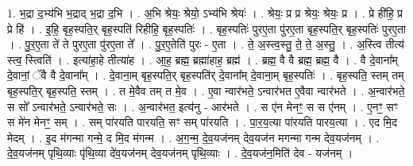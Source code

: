 \documentclass[17pt]{extarticle}
\begin{document}
1. भ॒द्रा द॒भ्य॑भि भ॒द्राद् भ॒द्रा द॒भि । . अ॒भि श्रेयः॒ श्रेयो॒ ऽभ्य॑भि श्रेयः॑ । . श्रेयः॒ प्र प्र श्रेयः॒ श्रेयः॒ प्र । . प्रे ही॑हि॒ प्र प्रे हि॑ । . इ॒हि॒ बृह॒स्पति॒र् बृह॒स्पति॑ रिहीहि॒ बृह॒स्पतिः॑ । . बृह॒स्पतिः॑ पुरए॒ता पु॑रए॒ता बृह॒स्पति॒र् बृह॒स्पतिः॑ पुरए॒ता । . पु॒र॒ए॒ता ते॑ ते पुरए॒ता पु॑रए॒ता ते᳚ । . पु॒र॒ए॒तेति॑ पुरः - ए॒ता । . ते॒ अ॒स्त्व॒स्तु॒ ते॒ ते॒ अ॒स्तु॒ । . अ॒स्त्वि तीत्य॑ स्त्व॒ स्त्विति॑ । . इत्या॑हा॒हे तीत्या॑ह । . आ॒ह॒ ब्रह्म॒ ब्रह्मा॑हाह॒ ब्रह्म॑ । . ब्रह्म॒ वै वै ब्रह्म॒ ब्रह्म॒ वै । . वै दे॒वाना᳚म् दे॒वानां॒ ॅवै वै दे॒वाना᳚म् । . दे॒वाना॒म् बृह॒स्पति॒र् बृह॒स्पति॑र् दे॒वाना᳚म् दे॒वाना॒म् बृह॒स्पतिः॑ । . बृह॒स्पति॒ स्तम् तम् बृह॒स्पति॒र् बृह॒स्पति॒ स्तम् । . त मे॒वैव तम् त मे॒व । . ए॒वा न्वार॑भते॒ ऽन्वार॑भत ए॒वैवा न्वार॑भते । . अ॒न्वार॑भते॒ स सो᳚ ऽन्वार॑भते॒ ऽन्वार॑भते॒ सः । . अ॒न्वार॑भत॒ इत्य॑नु - आर॑भते । . स ए॑न मेनꣳ॒॒ स स ए॑नम् । . ए॒नꣳ॒॒ सꣳ स मे॑न मेनꣳ॒॒ सम् । . सम् पा॑रयति पारयति॒ सꣳ सम् पा॑रयति । . पा॒र॒य॒त्या पा॑रयति पारय॒त्या । . एद मि॒द मेदम् । . इ॒द म॑गन्मा गन्मे॒ द मि॒द म॑गन्म । . अ॒ग॒न्म॒ दे॒व॒यज॑नम् देव॒यज॑न मगन्मा गन्म देव॒यज॑नम् । . दे॒व॒यज॑नम् पृथि॒व्याः पृ॑थि॒व्या दे॑व॒यज॑नम् देव॒यज॑नम् पृथि॒व्याः । . दे॒व॒यज॑न॒मिति॑ देव - यज॑नम् । \newline
\end{document}
